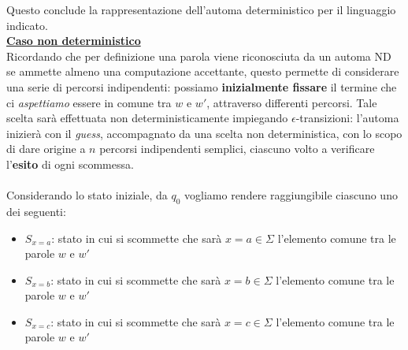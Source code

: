 \documentclass[a4paper,10pt]{article}
\begin{document}
{\begin{center}
\end{center}
}

Questo conclude la rappresentazione dell'automa deterministico per il linguaggio indicato.\\[0.3cm]

\underline{\textbf{Caso non deterministico}}\\[0.3cm]
Ricordando che per definizione una parola viene riconosciuta da un automa ND se ammette almeno una computazione accettante, questo permette di considerare una serie di percorsi indipendenti: possiamo \textbf{inizialmente fissare} il termine che ci \textit{aspettiamo} essere in comune tra $w$ e $w'$, attraverso differenti percorsi. Tale scelta sarà effettuata non deterministicamente impiegando $\epsilon$-transizioni: l'automa inizierà con il \textit{guess}, accompagnato da una scelta non deterministica, con lo scopo di dare origine a $n$ percorsi indipendenti semplici, ciascuno volto a verificare l'\textbf{esito} di ogni scommessa.
\\\\
Considerando lo stato iniziale, da $q_0$ vogliamo rendere raggiungibile ciascuno uno dei seguenti:
\begin{itemize}
    \item $S_{x=a}$: stato in cui si scommette che sarà $x=a\in\Sigma$ l'elemento comune tra le parole $w$ e $w'$
    \item $S_{x=b}$: stato in cui si scommette che sarà $x=b\in\Sigma$ l'elemento comune tra le parole $w$ e $w'$
    \item $S_{x=c}$: stato in cui si scommette che sarà $x=c\in\Sigma$ l'elemento comune tra le parole $w$ e $w'$
\end{itemize}
\end{document}
